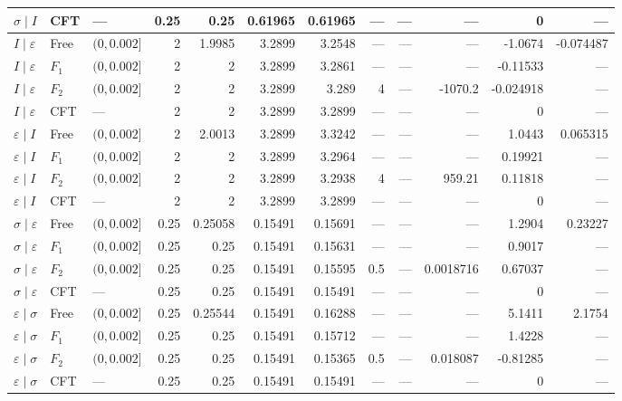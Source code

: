 \begin{longtable}{lllrrrrrrrrr}
$\sigma\mid I$ & CFT & --- & 0.25 & 0.25 & 0.61965 & 0.61965 & --- & --- & --- & 0 & ---\\
\midrule
$I\mid \varepsilon$ & Free & $(0,0.002]$ & 2 & 1.9985 & 3.2899 & 3.2548 & --- & --- & --- & -1.0674 & -0.074487\\*
$I\mid \varepsilon$ & $F_1$ & $(0,0.002]$ & 2 & 2 & 3.2899 & 3.2861 & --- & --- & --- & -0.11533 & ---\\*
$I\mid \varepsilon$ & $F_2$ & $(0,0.002]$ & 2 & 2 & 3.2899 & 3.289 & 4 & --- & -1070.2 & -0.024918 & ---\\*
$I\mid \varepsilon$ & CFT & --- & 2 & 2 & 3.2899 & 3.2899 & --- & --- & --- & 0 & ---\\
\midrule
$\varepsilon\mid I$ & Free & $(0,0.002]$ & 2 & 2.0013 & 3.2899 & 3.3242 & --- & --- & --- & 1.0443 & 0.065315\\*
$\varepsilon\mid I$ & $F_1$ & $(0,0.002]$ & 2 & 2 & 3.2899 & 3.2964 & --- & --- & --- & 0.19921 & ---\\*
$\varepsilon\mid I$ & $F_2$ & $(0,0.002]$ & 2 & 2 & 3.2899 & 3.2938 & 4 & --- & 959.21 & 0.11818 & ---\\*
$\varepsilon\mid I$ & CFT & --- & 2 & 2 & 3.2899 & 3.2899 & --- & --- & --- & 0 & ---\\
\midrule
$\sigma\mid \varepsilon$ & Free & $(0,0.002]$ & 0.25 & 0.25058 & 0.15491 & 0.15691 & --- & --- & --- & 1.2904 & 0.23227\\*
$\sigma\mid \varepsilon$ & $F_1$ & $(0,0.002]$ & 0.25 & 0.25 & 0.15491 & 0.15631 & --- & --- & --- & 0.9017 & ---\\*
$\sigma\mid \varepsilon$ & $F_2$ & $(0,0.002]$ & 0.25 & 0.25 & 0.15491 & 0.15595 & 0.5 & --- & 0.0018716 & 0.67037 & ---\\*
$\sigma\mid \varepsilon$ & CFT & --- & 0.25 & 0.25 & 0.15491 & 0.15491 & --- & --- & --- & 0 & ---\\
\midrule
$\varepsilon\mid \sigma$ & Free & $(0,0.002]$ & 0.25 & 0.25544 & 0.15491 & 0.16288 & --- & --- & --- & 5.1411 & 2.1754\\*
$\varepsilon\mid \sigma$ & $F_1$ & $(0,0.002]$ & 0.25 & 0.25 & 0.15491 & 0.15712 & --- & --- & --- & 1.4228 & ---\\*
$\varepsilon\mid \sigma$ & $F_2$ & $(0,0.002]$ & 0.25 & 0.25 & 0.15491 & 0.15365 & 0.5 & --- & 0.018087 & -0.81285 & ---\\*
$\varepsilon\mid \sigma$ & CFT & --- & 0.25 & 0.25 & 0.15491 & 0.15491 & --- & --- & --- & 0 & ---\\
\end{longtable}
\endgroup
